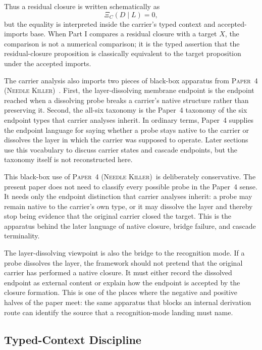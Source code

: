 \documentclass[11pt]{article}
\newcommand{\PaperNeedles}{\textsc{Paper~4 (Needle Killer)}}
\theoremstyle{definition}
\begin{document}
Thus a residual closure is written schematically as
\[
  \Xi_C(D\mid L)=0,
\]
but the equality is interpreted inside the carrier's typed context and
accepted-imports base.  When Part I compares a residual closure with a
target \(X\), the comparison is not a numerical comparison; it is the
typed assertion that the residual-closure proposition is classically
equivalent to the target proposition under the accepted imports.

The carrier analysis also imports two pieces of black-box apparatus
from \PaperNeedles\ \cite{Tsiokos2026NeedleKiller}.  First, the
layer-dissolving membrane endpoint is the endpoint reached when a
dissolving probe breaks a carrier's native structure rather than
preserving it.  Second, the all-six taxonomy is the Paper~4 taxonomy
of the six endpoint types that carrier analyses inherit.  In ordinary
terms, Paper~4 supplies the endpoint language for saying whether a
probe stays native to the carrier or dissolves the layer in which the
carrier was supposed to operate.  Later sections use this vocabulary
to discuss carrier states and cascade endpoints, but the taxonomy
itself is not reconstructed here.

This black-box use of \PaperNeedles\ is deliberately conservative.
The present paper does not need to classify every possible probe in
the Paper~4 sense.  It needs only the endpoint distinction that
carrier analyses inherit: a probe may remain native to the carrier's
own type, or it may dissolve the layer and thereby stop being evidence
that the original carrier closed the target.  This is the apparatus
behind the later language of native closure, bridge failure, and
cascade terminality.

The layer-dissolving viewpoint is also the bridge to the recognition
mode.  If a probe dissolves the layer, the framework should not pretend
that the original carrier has performed a native closure.  It must
either record the dissolved endpoint as external content or explain how
the endpoint is accepted by the closure formation.  This is one of the
places where the negative and positive halves of the paper meet: the
same apparatus that blocks an internal derivation route can identify
the source that a recognition-mode landing must name.

\subsection{Typed-Context Discipline}\label{sec:apparatus:typed-context}
\end{document}
